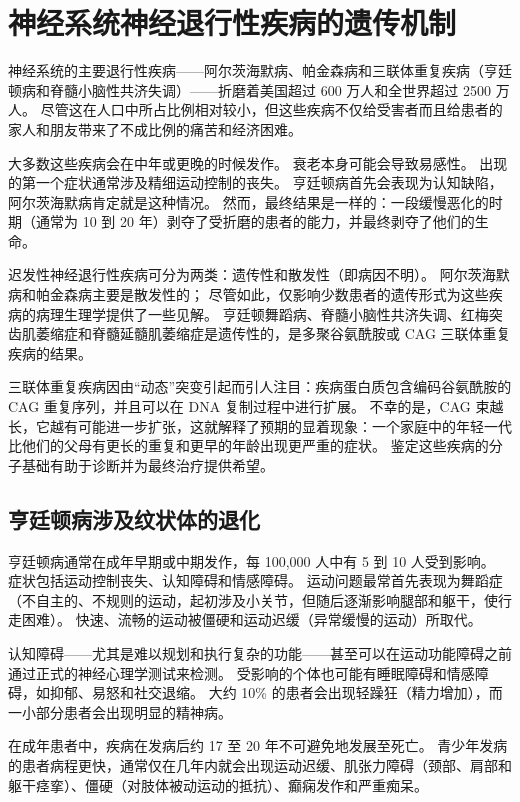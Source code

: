 \chapter{神经系统神经退行性疾病的遗传机制} \label{chap:chap63}

神经系统的主要退行性疾病——阿尔茨海默病、帕金森病和三联体重复疾病（亨廷顿病和脊髓小脑性共济失调）——折磨着美国超过 600 万人和全世界超过 2500 万人。 尽管这在人口中所占比例相对较小，但这些疾病不仅给受害者而且给患者的家人和朋友带来了不成比例的痛苦和经济困难。

大多数这些疾病会在中年或更晚的时候发作。 衰老本身可能会导致易感性。 出现的第一个症状通常涉及精细运动控制的丧失。 亨廷顿病首先会表现为认知缺陷，阿尔茨海默病肯定就是这种情况。 然而，最终结果是一样的：一段缓慢恶化的时期（通常为 10 到 20 年）剥夺了受折磨的患者的能力，并最终剥夺了他们的生命。

迟发性神经退行性疾病可分为两类：遗传性和散发性（即病因不明）。 阿尔茨海默病和帕金森病主要是散发性的； 尽管如此，仅影响少数患者的遗传形式为这些疾病的病理生理学提供了一些见解。 亨廷顿舞蹈病、脊髓小脑性共济失调、红梅突齿肌萎缩症和脊髓延髓肌萎缩症是遗传性的，是多聚谷氨酰胺或 CAG 三联体重复疾病的结果。

三联体重复疾病因由“动态”突变引起而引人注目：疾病蛋白质包含编码谷氨酰胺的 CAG 重复序列，并且可以在 DNA 复制过程中进行扩展。 不幸的是，CAG 束越长，它越有可能进一步扩张，这就解释了预期的显着现象：一个家庭中的年轻一代比他们的父母有更长的重复和更早的年龄出现更严重的症状。 鉴定这些疾病的分子基础有助于诊断并为最终治疗提供希望。

\section{亨廷顿病涉及纹状体的退化}
亨廷顿病通常在成年早期或中期发作，每 100,000 人中有 5 到 10 人受到影响。 症状包括运动控制丧失、认知障碍和情感障碍。 运动问题最常首先表现为舞蹈症（不自主的、不规则的运动，起初涉及小关节，但随后逐渐影响腿部和躯干，使行走困难）。 快速、流畅的运动被僵硬和运动迟缓（异常缓慢的运动）所取代。

认知障碍——尤其是难以规划和执行复杂的功能——甚至可以在运动功能障碍之前通过正式的神经心理学测试来检测。 受影响的个体也可能有睡眠障碍和情感障碍，如抑郁、易怒和社交退缩。 大约 10\% 的患者会出现轻躁狂（精力增加），而一小部分患者会出现明显的精神病。

在成年患者中，疾病在发病后约 17 至 20 年不可避免地发展至死亡。 青少年发病的患者病程更快，通常仅在几年内就会出现运动迟缓、肌张力障碍（颈部、肩部和躯干痉挛）、僵硬（对肢体被动运动的抵抗）、癫痫发作和严重痴呆。

